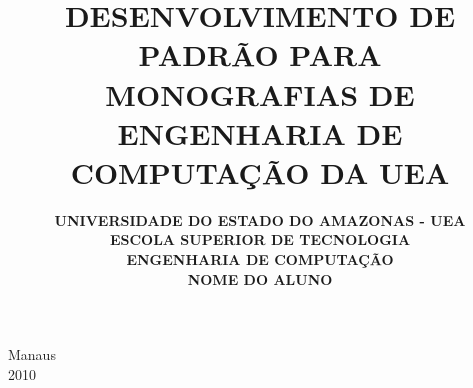 \documentclass{dcctese}
\begin{document}


\thispagestyle{empty}



\title{ \textbf{DESENVOLVIMENTO DE PADR\~{A}O PARA MONOGRAFIAS DE ENGENHARIA DE COMPUTA\c{C}\~{A}O DA UEA}}

\author{ \bf UNIVERSIDADE DO ESTADO DO AMAZONAS - UEA\\[12pt] \bf ESCOLA SUPERIOR DE TECNOLOGIA \\[12pt] \bf ENGENHARIA DE COMPUTA\c{C}\~AO\\ [96pt] NOME DO ALUNO}


 \maketitle

\begin{center}
\large Manaus\\
\large 2010
\end{center}

\newpage


\newpage



\newpage


\let\cleardoublepage\clearpage

\newpage
\end{document}
